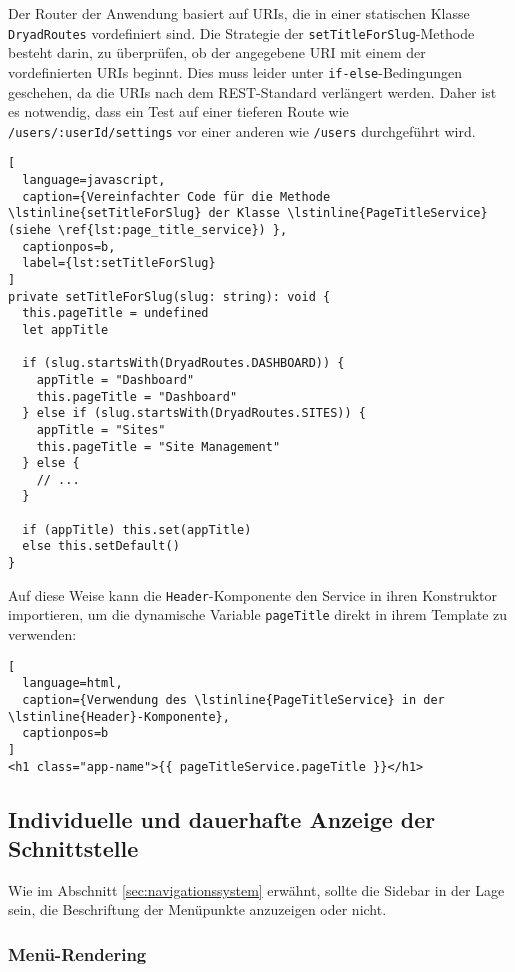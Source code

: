 Der Router der Anwendung basiert auf \ac{URI}s, die in einer statischen Klasse \lstinline{DryadRoutes} vordefiniert sind.
Die Strategie der \lstinline{setTitleForSlug}-Methode besteht darin, zu überprüfen, ob der angegebene \ac{URI} mit einem der vordefinierten \ac{URI}s beginnt.
Dies muss leider unter \lstinline{if-else}-Bedingungen geschehen, da die \ac{URI}s nach dem \ac{REST}-Standard verlängert werden.
Daher ist es notwendig, dass ein Test auf einer tieferen Route wie \lstinline{/users/:userId/settings} vor einer anderen wie \lstinline{/users} durchgeführt wird.

\begin{lstlisting}[
  language=javascript,
  caption={Vereinfachter Code für die Methode \lstinline{setTitleForSlug} der Klasse \lstinline{PageTitleService} (siehe \ref{lst:page_title_service}) },
  captionpos=b,
  label={lst:setTitleForSlug}
]
private setTitleForSlug(slug: string): void {
  this.pageTitle = undefined
  let appTitle

  if (slug.startsWith(DryadRoutes.DASHBOARD)) {
    appTitle = "Dashboard"
    this.pageTitle = "Dashboard"
  } else if (slug.startsWith(DryadRoutes.SITES)) {
    appTitle = "Sites"
    this.pageTitle = "Site Management"
  } else {
    // ...
  }

  if (appTitle) this.set(appTitle)
  else this.setDefault()
}
\end{lstlisting}

Auf diese Weise kann die \lstinline{Header}-Komponente den Service in ihren Konstruktor importieren, um die dynamische Variable \lstinline{pageTitle} direkt in ihrem Template zu verwenden:

\begin{lstlisting}[
  language=html,
  caption={Verwendung des \lstinline{PageTitleService} in der \lstinline{Header}-Komponente},
  captionpos=b
]
<h1 class="app-name">{{ pageTitleService.pageTitle }}</h1>
\end{lstlisting}


\subsection{Individuelle und dauerhafte Anzeige der Schnittstelle}

Wie im Abschnitt \ref{sec:navigationssystem} erwähnt, sollte die Sidebar in der Lage sein, die Beschriftung der Menüpunkte anzuzeigen oder nicht.

\subsubsection{Menü-Rendering}

